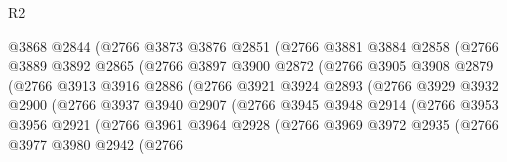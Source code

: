 \begin{lexlean}{R2}
\begin{coremodule}
                        @3868
                        @2844
                        (@2766
                          @3873
                          @3876
                          @2851
                          (@2766
                            @3881
                            @3884
                            @2858
                            (@2766
                              @3889
                              @3892
                              @2865
                              (@2766
                                @3897
                                @3900
                                @2872
                                (@2766
                                  @3905
                                  @3908
                                  @2879
                                  (@2766
                                    @3913
                                    @3916
                                    @2886
                                    (@2766
                                      @3921
                                      @3924
                                      @2893
                                      (@2766
                                        @3929
                                        @3932
                                        @2900
                                        (@2766
                                          @3937
                                          @3940
                                          @2907
                                          (@2766
                                            @3945
                                            @3948
                                            @2914
                                            (@2766
                                              @3953
                                              @3956
                                              @2921
                                              (@2766
                                                @3961
                                                @3964
                                                @2928
                                                (@2766
                                                  @3969
                                                  @3972
                                                  @2935
                                                  (@2766
                                                    @3977
                                                    @3980
                                                    @2942
                                                    (@2766

\end{coremodule}
\end{lexlean}
